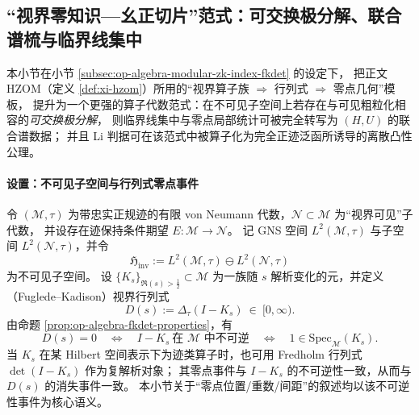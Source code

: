 \subsection{“视界零知识—幺正切片”范式：可交换极分解、联合谱梳与临界线集中}\label{subsec:op-algebra-hzom-unitary-slice-rh}
本小节在小节 \ref{subsec:op-algebra-modular-zk-index-fkdet} 的设定下，
把正文 HZOM（定义 \ref{def:xi-hzom}）所用的“视界算子族 \(\Rightarrow\) 行列式 \(\Rightarrow\) 零点几何”模板，
提升为一个更强的算子代数范式：在不可见子空间上若存在与可见粗粒化相容的\emph{可交换极分解}，
则临界线集中与零点局部统计可被完全转写为 \((H,U)\) 的联合谱数据；
并且 Li 判据可在该范式中被算子化为完全正迹泛函所诱导的离散凸性公理。

\paragraph{设置：不可见子空间与行列式零点事件}
令 \((\mathcal{M},\tau)\) 为带忠实正规迹的有限 von Neumann 代数，\(\mathcal{N}\subset\mathcal{M}\) 为“视界可见”子代数，
并设存在迹保持条件期望 \(E:\mathcal{M}\to\mathcal{N}\)。
记 GNS 空间 \(L^2(\mathcal{M},\tau)\) 与子空间 \(L^2(\mathcal{N},\tau)\)，并令
\[
\mathfrak{H}_{\mathrm{inv}}:=L^2(\mathcal{M},\tau)\ominus L^2(\mathcal{N},\tau)
\]
为不可见子空间。
设 \(\{K_s\}_{\Re(s)>\tfrac12}\subset\mathcal{M}\) 为一族随 \(s\) 解析变化的元，并定义（Fuglede--Kadison）视界行列式
\[
D(s):=\Delta_\tau(I-K_s)\ \in\ [0,\infty).
\]
由命题 \ref{prop:op-algebra-fkdet-properties}，有
\[
D(s)=0\quad\Longleftrightarrow\quad I-K_s\ \text{在 }\mathcal{M}\text{ 中不可逆}
\quad\Longleftrightarrow\quad 1\in \mathrm{Spec}_{\mathcal{M}}(K_s).
\]
当 \(K_s\) 在某 Hilbert 空间表示下为迹类算子时，也可用 Fredholm 行列式 \(\det(I-K_s)\) 作为复解析对象；
其零点事件与 \(I-K_s\) 的不可逆性一致，从而与 \(D(s)\) 的消失事件一致。
本小节关于“零点位置/重数/间距”的叙述均以该不可逆性事件为核心语义。

